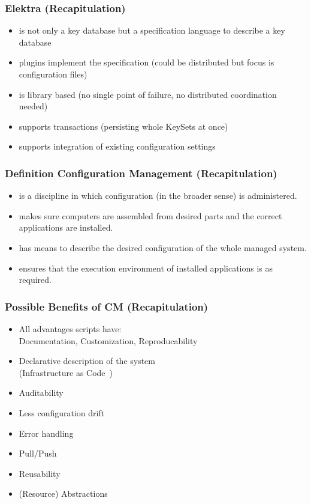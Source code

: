 \begin{frame}
	\frametitle{Elektra (Recapitulation)}

	\pause

	\begin{itemize}
	\item is not only a key database but a specification language to describe a key database
	\item plugins implement the specification (could be distributed but focus is configuration files)
	\item is library based (no single point of failure, no distributed coordination needed)
	\item supports transactions (persisting whole KeySets at once)
	\item supports integration of existing configuration settings
	\end{itemize}
\end{frame}

\begin{frame}
	\frametitle{Definition Configuration Management (Recapitulation)}

	\pause

	\begin{itemize}
	\item is a discipline in which configuration (in the broader sense) is administered.
	\item makes sure computers are assembled from desired parts and the correct applications are installed.
	\item has means to describe the desired configuration of the whole managed system.
	\item ensures that the execution environment of installed applications is as required.
	\end{itemize}
\end{frame}

\begin{frame}
	\frametitle{Possible Benefits of CM (Recapitulation)}

	\pause

	\begin{itemize} %
	\item All advantages scripts have: \\
		Documentation, Customization, Reproducability
	\item Declarative description of the system \\
		(Infrastructure as Code~\cite{waldemar2013testing})
	\item Auditability
	\item Less configuration drift
	\item Error handling
	\item Pull/Push
	\item Reusability
	\item (Resource) Abstractions
	\end{itemize}
\end{frame}

